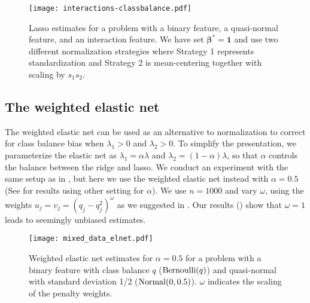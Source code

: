 \begin{figure}[htpb]
  \centering
  \texttt{[image: interactions-classbalance.pdf]}
  \caption{%
    Lasso estimates for a problem with a binary feature, a quasi-normal feature, and
    an interaction feature. We have set \(\bm{\beta}^* = \bm{1}\) and use two different normalization strategies where
    Strategy 1 represents standardization and Strategy 2 is mean-centering
    together with scaling by \(s_1 s_2\).
  }
  \label{fig:interactions}
\end{figure}

\subsection{The weighted elastic net}

The weighted elastic net can be used as an alternative to normalization to correct for
class balance bias when \(\lambda_1 > 0\) and \(\lambda_2 >0\). To simplify the
presentation, we parameterize the elastic net as \(\lambda_1 = \alpha \lambda \) and
\(\lambda_2 = (1-\alpha) \lambda\), so that \(\alpha\) controls the balance between the
ridge and lasso. We conduct an experiment with the same setup as in
, but here we use the weighted elastic net instead with
\(\alpha = 0.5\) (See  for results using
other setting for \(\alpha\)). We use \(n=1000\) and vary \(\omega\), using the weights
\(u_j = v_j = (q_j - q_j^2)^{\omega}\) as we suggested in . Our
results () show that \(\omega = 1\) leads to seemingly unbiased
estimates.

\begin{figure}[htpb]
  \centering
  \texttt{[image: mixed\_data\_elnet.pdf]}
  \caption{%
    Weighted elastic net estimates for \(\alpha = 0.5\) for a problem with a binary
    feature with class balance \(q\) (\(\operatorname{Bernoulli}(q)\)) and quasi-normal
    with standard deviation 1/2 (\(\operatorname{Normal}(0, 0.5)\)). \(\omega\) indicates
    the scaling of the penalty weights.
  }
  \label{fig:mixed-data-elnet}
\end{figure}

